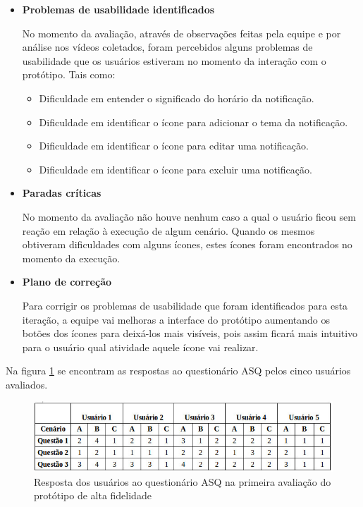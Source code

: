 \begin{itemize}
       \item \textbf{Problemas de usabilidade identificados}
       
       \subitem No momento da avaliação, através de observações feitas pela equipe e por análise nos vídeos coletados, foram percebidos 
       alguns problemas de usabilidade que os usuários estiveram no momento da interação com o protótipo. Tais como:
       
       \begin{itemize}
       
       \item Dificuldade em entender o significado do horário da notificação.
       
       \item Dificuldade em identificar o ícone para adicionar o tema da notificação.
       
       \item Dificuldade em identificar o ícone para editar uma notificação.
       
       \item Dificuldade em identificar o ícone para excluir uma notificação.
       
       \end{itemize}
       
       \item \textbf{Paradas críticas}
       
       \subitem No momento da avaliação não houve nenhum caso a qual o usuário ficou sem reação em relação à execução de algum cenário. 
       Quando os mesmos obtiveram dificuldades com alguns ícones, estes ícones foram encontrados no momento da execução.
       
       \item \textbf{Plano de correção}
       
       \subitem Para corrigir os problemas de usabilidade que foram identificados para esta iteração, a equipe vai melhoras a interface do 
       protótipo aumentando os botões dos ícones para deixá-los mais visíveis, pois assim ficará mais intuitivo para o usuário qual 
       atividade aquele ícone vai realizar.
       
      \end{itemize}
      
      Na figura \ref{asqalta} se encontram as respostas ao questionário ASQ pelos cinco usuários avaliados.
      
  \begin{figure}[!htb]
  \centering
  \includegraphics[scale=0.6]{figuras/asqalta.jpg}
  \caption{Resposta dos usuários ao questionário ASQ na primeira avaliação do protótipo de alta fidelidade}
  \label{asqalta}
  \end{figure}
      
